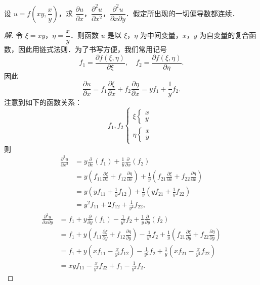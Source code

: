 \begin{example}\label{ex:16-2-4}
设 $u=f\left(xy,\dfrac{x}{y}\right)$，求 $\dfrac{\partial u}{\partial x}$，$\dfrac{\partial^{2}u}{\partial x^{2}}$，$\dfrac{\partial^{2}u}{\partial x\partial y}$．假定所出现的一切偏导数都连续．
\end{example}

\begin{proof}[解]
令 $\xi=xy$，$\eta=\dfrac{x}{y}$．则函数 $u$ 是以 $\xi$，$\eta$ 为中间变量，$x$，$y$ 为自变量的复合函数，因此用链式法则．为了书写方便，我们常用记号
\[
f_{1}=\frac{\partial f(\xi,\eta)}{\partial\xi},\quad f_{2}=\frac{\partial f(\xi,\eta)}{\partial\eta}.
\]
因此
\[
\frac{\partial u}{\partial x}=f_{1}\frac{\partial\xi}{\partial x}+f_{2}\frac{\partial\eta}{\partial x}=yf_{1}+\frac{1}{y}f_{2}.
\]
注意到如下的函数关系：
\[
f_{1},f_{2}\left\{\begin{array}{l}\xi\left\{\begin{array}{l}x\\ y\end{array}\right.\\[4pt] \eta\left\{\begin{array}{l}x\\ y\end{array}\right.\end{array}\right.
\]
则
\[
\begin{aligned}
\frac{\partial^{2}u}{\partial x^{2}}&=y\frac{\partial}{\partial x}(f_{1})+\frac{1}{y}\frac{\partial}{\partial x}(f_{2})\\
&=y\left(f_{11}\frac{\partial\xi}{\partial x}+f_{12}\frac{\partial\eta}{\partial x}\right)+\frac{1}{y}\left(f_{21}\frac{\partial\xi}{\partial x}+f_{22}\frac{\partial\eta}{\partial x}\right)\\
&=y\left(yf_{11}+\frac{1}{y}f_{12}\right)+\frac{1}{y}\left(yf_{21}+\frac{1}{y}f_{22}\right)\\
&=y^{2}f_{11}+2f_{12}+\frac{1}{y^{2}}f_{22},
\end{aligned}
\]
\[
\begin{aligned}
\frac{\partial^{2}u}{\partial x\partial y}&=f_{1}+y\frac{\partial}{\partial y}(f_{1})-\frac{1}{y^{2}}f_{2}+\frac{1}{y}\frac{\partial}{\partial y}(f_{2})\\
&=f_{1}+y\left(f_{11}\frac{\partial\xi}{\partial y}+f_{12}\frac{\partial\eta}{\partial y}\right)-\frac{1}{y^{2}}f_{2}+\frac{1}{y}\left(f_{21}\frac{\partial\xi}{\partial y}+f_{22}\frac{\partial\eta}{\partial y}\right)\\
&=f_{1}+y\left(xf_{11}-\frac{x}{y^{2}}f_{12}\right)-\frac{1}{y^{2}}f_{2}+\frac{1}{y}\left(xf_{21}-\frac{x}{y^{2}}f_{22}\right)\\
&=xyf_{11}-\frac{x}{y^{3}}f_{22}+f_{1}-\frac{1}{y^{2}}f_{2}.
\end{aligned}
\]
\end{proof}

